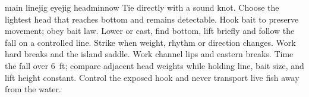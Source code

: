
{{main line}{jig eye}{jig head}{minnow}}
{Tie directly with a sound knot. Choose the lightest head that reaches bottom
and remains detectable. Hook bait to preserve movement; obey bait law.}
{Lower or cast, find bottom, lift briefly and follow the fall on a controlled
line. Strike when weight, rhythm or direction changes.}
{Work hard breaks and the island saddle.}
{Work channel lips and eastern breaks.}
{Time the fall over \qty{6}{ft}; compare adjacent head weights while holding
line, bait size, and lift height constant.}
{Control the exposed hook and never transport live fish away from the water.}
